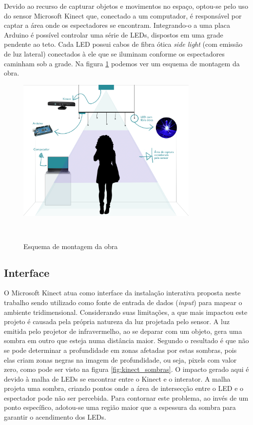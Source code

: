 Devido ao recurso de capturar objetos e movimentos no espaço, optou-se pelo uso do sensor Microsoft Kinect que, conectado a um computador, é responsável por captar a área onde os espectadores se encontram. Integrando-o a uma placa Arduino é possível controlar uma série de LEDs, dispostos em uma grade pendente ao teto. Cada LED possui cabos de fibra ótica \textit{side light} (com emissão de luz lateral) conectados à ele que se iluminam conforme os espectadores caminham sob a grade. Na figura \ref{fig:esquema} podemos ver um esquema de montagem da obra.

\begin{figure}[H]
  \begin{center}
    \caption{Esquema de montagem da obra}
    \vspace*{0,2cm}
    \includegraphics[width=0.8\textwidth]{./04-figuras/esquema}
    \label{fig:esquema}
  \end{center}
  \vspace*{-0,5cm}
  \\
\end{figure}


\subsection{Interface}

O Microsoft Kinect atua como interface da instalação interativa proposta neste trabalho sendo utilizado como fonte de entrada de dados (\textit{input}) para mapear o ambiente tridimensional. Considerando suas limitações, a que mais impactou este projeto é causada pela própria natureza da luz projetada pelo sensor. A luz emitida pelo projetor de infravermelho, ao se deparar com um objeto, gera uma sombra em outro que esteja numa distância maior. Segundo  o resultado é que não se pode determinar a profundidade em zonas afetadas por estas sombras, pois elas criam zonas negras na imagem de profundidade, ou seja, pixels com valor zero, como pode ser visto na figura \ref{fig:kinect_sombras}. O impacto gerado aqui é devido à malha de LEDs se encontrar entre o Kinect e o interator. A malha projeta uma sombra, criando pontos onde a área de intersecção entre o LED e o espectador pode não ser percebida. Para contornar este problema, ao invés de um ponto específico, adotou-se uma região maior que a espessura da sombra para garantir o acendimento dos LEDs.

